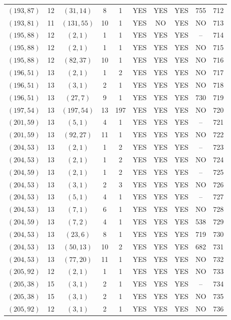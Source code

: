 \begin{longtable}{|c|c|c|c|c|c|c|c|c|c|}
$(193, 87)$ & 12 & $(31, 14)$ & 8 & 1 & YES & YES & YES & 755 & 712\\
$(193, 81)$ & 11 & $(131, 55)$ & 10 & 1 & YES & NO & YES & NO & 713\\
$(195, 88)$ & 12 & $(2, 1)$ & 1 & 1 & YES & YES & YES & -- & 714\\
$(195, 88)$ & 12 & $(2, 1)$ & 1 & 1 & YES & YES & YES & NO & 715\\
$(195, 88)$ & 12 & $(82, 37)$ & 10 & 1 & YES & YES & YES & NO & 716\\
$(196, 51)$ & 13 & $(2, 1)$ & 1 & 2 & YES & YES & YES & NO & 717\\
$(196, 51)$ & 13 & $(3, 1)$ & 2 & 1 & YES & YES & YES & NO & 718\\
$(196, 51)$ & 13 & $(27, 7)$ & 9 & 1 & YES & YES & YES & 730 & 719\\
$(197, 54)$ & 13 & $(197, 54)$ & 13 & 197 & YES & YES & YES & NO & 720\\
$(201, 59)$ & 13 & $(5, 1)$ & 4 & 1 & YES & YES & YES & -- & 721\\
$(201, 59)$ & 13 & $(92, 27)$ & 11 & 1 & YES & YES & YES & NO & 722\\
$(204, 53)$ & 13 & $(2, 1)$ & 1 & 2 & YES & YES & YES & -- & 723\\
$(204, 53)$ & 13 & $(2, 1)$ & 1 & 2 & YES & YES & YES & NO & 724\\
$(204, 59)$ & 13 & $(2, 1)$ & 1 & 2 & YES & YES & YES & -- & 725\\
$(204, 53)$ & 13 & $(3, 1)$ & 2 & 3 & YES & YES & YES & NO & 726\\
$(204, 53)$ & 13 & $(5, 1)$ & 4 & 1 & YES & YES & YES & -- & 727\\
$(204, 53)$ & 13 & $(7, 1)$ & 6 & 1 & YES & YES & YES & NO & 728\\
$(204, 59)$ & 13 & $(7, 2)$ & 4 & 1 & YES & YES & YES & 538 & 729\\
$(204, 53)$ & 13 & $(23, 6)$ & 8 & 1 & YES & YES & YES & 719 & 730\\
$(204, 53)$ & 13 & $(50, 13)$ & 10 & 2 & YES & YES & YES & 682 & 731\\
$(204, 53)$ & 13 & $(77, 20)$ & 11 & 1 & YES & YES & YES & NO & 732\\
$(205, 92)$ & 12 & $(2, 1)$ & 1 & 1 & YES & YES & YES & NO & 733\\
$(205, 38)$ & 15 & $(3, 1)$ & 2 & 1 & YES & YES & YES & -- & 734\\
$(205, 38)$ & 15 & $(3, 1)$ & 2 & 1 & YES & YES & YES & NO & 735\\
$(205, 92)$ & 12 & $(3, 1)$ & 2 & 1 & YES & YES & YES & NO & 736\\

\end{longtable}
